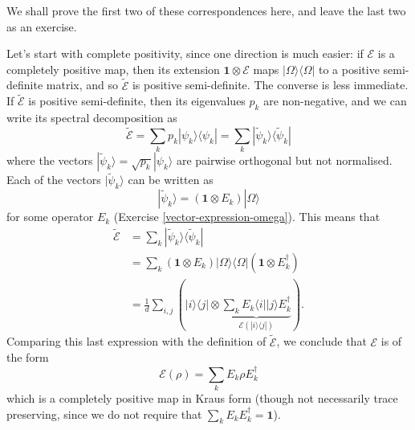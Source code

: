 \documentclass[fleqn,a4paper]{article}
\theoremstyle{definition}
\theoremstyle{definition}
\theoremstyle{definition}
\theoremstyle{definition}
\theoremstyle{remark}
\begin{document}
We shall prove the first two of these correspondences here, and leave the last two as an exercise.

Let's start with complete positivity, since one direction is much easier: if \(\mathcal{E}\) is a completely positive map, then its extension \(\mathbf{1}\otimes\mathcal{E}\) maps \(|\Omega\rangle\langle\Omega|\) to a positive semi-definite matrix, and so \(\widetilde{\mathcal{E}}\) is positive semi-definite.
The converse is less immediate.
If \(\widetilde{\mathcal{E}}\) is positive semi-definite, then its eigenvalues \(p_k\) are non-negative, and we can write its spectral decomposition as
\[
  \widetilde{\mathcal{E}}
  = \sum_k p_k|\psi_k\rangle\langle\psi_k|
  = \sum_k |\widetilde{\psi}_k\rangle\langle\widetilde{\psi}_k|
\]
where the vectors \(|\widetilde{\psi}_k\rangle=\sqrt{p_k}|\psi_k\rangle\) are pairwise orthogonal but not normalised.
Each of the vectors \(|\widetilde{\psi}_k\rangle\) can be written as
\[
  |\widetilde{\psi}_k\rangle
  = (\mathbf{1}\otimes E_k)|\Omega\rangle
\]
for some operator \(E_k\) (Exercise \ref{vector-expression-omega}).
This means that
\[
  \begin{aligned}
    \widetilde{\mathcal{E}}
    &= \sum_k |\widetilde{\psi}_k\rangle\langle\widetilde{\psi}_k|
  \\&= \sum_k (\mathbf{1}\otimes E_k)|\Omega\rangle\langle\Omega|(\mathbf{1}\otimes E_k^\dagger)
  \\&= \frac{1}{d}\sum_{i,j} \left(|i\rangle\langle j|\otimes\underbrace{\sum_k E_k\langle i||j\rangle E_k^\dagger}_{\mathcal{E}(|i\rangle\langle j|)}\right).
  \end{aligned}
\]
Comparing this last expression with the definition of \(\widetilde{\mathcal{E}}\), we conclude that \(\mathcal{E}\) is of the form
\[
  \mathcal{E}(\rho)
  = \sum_k E_k\rho E_k^\dagger
\]
which is a completely positive map in Kraus form (though not necessarily trace preserving, since we do not require that \(\sum_k E_k E_k^\dagger=\mathbf{1}\)).
\end{document}
